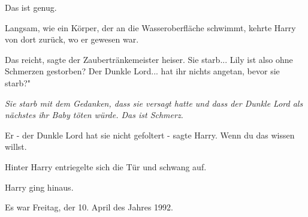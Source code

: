 \glqq{}Das ist genug.\grqq{}

Langsam, wie ein Körper, der an die Wasseroberfläche schwimmt, kehrte Harry von
dort zurück, wo er gewesen war.

\glqq{}Das reicht\grqq{}, sagte der Zaubertränkemeister heiser. \glqq{}Sie
starb... Lily ist also ohne Schmerzen gestorben? Der Dunkle Lord... hat ihr
nichts angetan, bevor sie starb?"

\emph{Sie starb mit dem Gedanken, dass sie versagt hatte und dass der Dunkle
Lord als nächstes ihr Baby töten würde. Das ist Schmerz.}

\glqq{}Er - der Dunkle Lord hat sie nicht gefoltert -\grqq{} sagte Harry. \glqq{}
Wenn du das wissen willst.\grqq{}

Hinter Harry entriegelte sich die Tür und schwang auf.

Harry ging hinaus.

Es war Freitag, der 10. April des Jahres 1992.


